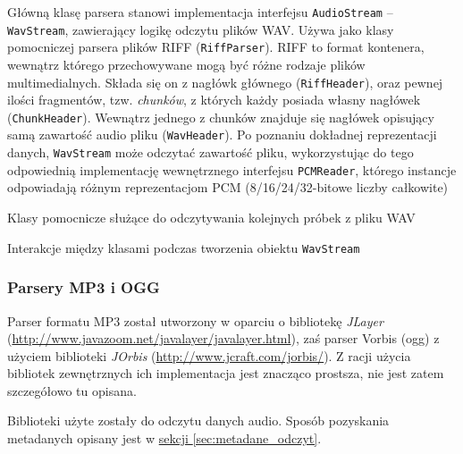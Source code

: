 
Główną klasę parsera stanowi implementacja interfejsu \texttt{AudioStream} -- \texttt{WavStream},
zawierający logikę odczytu plików WAV. Używa jako klasy pomocniczej parsera plików RIFF
(\texttt{RiffParser}). RIFF to format kontenera, wewnątrz którego przechowywane mogą być różne
rodzaje plików multimedialnych. Składa się on z nagłówk głównego (\texttt{RiffHeader}), oraz pewnej
ilości fragmentów, tzw. \textit{chunków}, z których każdy posiada własny nagłówek
(\texttt{ChunkHeader}). Wewnątrz jednego z chunków znajduje się nagłówek opisujący samą zawartość
audio pliku (\texttt{WavHeader}). Po poznaniu dokładnej reprezentacji danych, \texttt{WavStream}
może odczytać zawartość pliku, wykorzystując do tego odpowiednią implementację wewnętrznego
interfejsu \texttt{PCMReader}, którego instancje odpowiadają różnym reprezentacjom PCM
(8/16/24/32-bitowe liczby całkowite)

{Klasy pomocnicze służące do odczytywania kolejnych próbek z pliku WAV}

{Interakcje między klasami podczas tworzenia obiektu \texttt{WavStream}}


\subsubsection{Parsery MP3 i OGG}

Parser formatu MP3 został utworzony w oparciu o bibliotekę
\emph{JLayer} (\url{http://www.javazoom.net/javalayer/javalayer.html}), zaś parser Vorbis (ogg) z
użyciem biblioteki \emph{JOrbis} (\url{http://www.jcraft.com/jorbis/}). Z racji użycia bibliotek
zewnętrznych ich implementacja jest znacząco prostsza, nie jest zatem szczegółowo tu opisana.

Biblioteki użyte zostały do odczytu danych audio. Sposób pozyskania metadanych opisany jest w
\hyperref[sec:metadane_odczyt]{sekcji \ref*{sec:metadane_odczyt}}.



